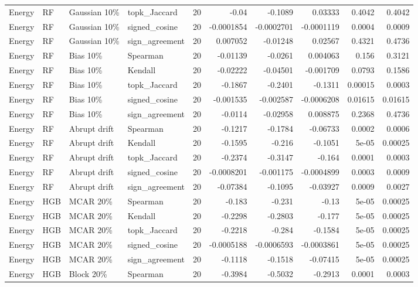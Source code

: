 \begin{tabular}{llllrrrrrr}
Energy & RF & Gaussian 10\% & topk\_Jaccard & 20 & -0.04 & -0.1089 & 0.03333 & 0.4042 & 0.4042 \\
Energy & RF & Gaussian 10\% & signed\_cosine & 20 & -0.0001854 & -0.0002701 & -0.0001119 & 0.0004 & 0.0009 \\
Energy & RF & Gaussian 10\% & sign\_agreement & 20 & 0.007052 & -0.01248 & 0.02567 & 0.4321 & 0.4736 \\
Energy & RF & Bias 10\% & Spearman & 20 & -0.01139 & -0.0261 & 0.004063 & 0.156 & 0.3121 \\
Energy & RF & Bias 10\% & Kendall & 20 & -0.02222 & -0.04501 & -0.001709 & 0.0793 & 0.1586 \\
Energy & RF & Bias 10\% & topk\_Jaccard & 20 & -0.1867 & -0.2401 & -0.1311 & 0.00015 & 0.0003 \\
Energy & RF & Bias 10\% & signed\_cosine & 20 & -0.001535 & -0.002587 & -0.0006208 & 0.01615 & 0.01615 \\
Energy & RF & Bias 10\% & sign\_agreement & 20 & -0.0114 & -0.02958 & 0.008875 & 0.2368 & 0.4736 \\
Energy & RF & Abrupt drift & Spearman & 20 & -0.1217 & -0.1784 & -0.06733 & 0.0002 & 0.0006 \\
Energy & RF & Abrupt drift & Kendall & 20 & -0.1595 & -0.216 & -0.1051 & 5e-05 & 0.00025 \\
Energy & RF & Abrupt drift & topk\_Jaccard & 20 & -0.2374 & -0.3147 & -0.164 & 0.0001 & 0.0003 \\
Energy & RF & Abrupt drift & signed\_cosine & 20 & -0.0008201 & -0.001175 & -0.0004899 & 0.0003 & 0.0009 \\
Energy & RF & Abrupt drift & sign\_agreement & 20 & -0.07384 & -0.1095 & -0.03927 & 0.0009 & 0.0027 \\
Energy & HGB & MCAR 20\% & Spearman & 20 & -0.183 & -0.231 & -0.13 & 5e-05 & 0.00025 \\
Energy & HGB & MCAR 20\% & Kendall & 20 & -0.2298 & -0.2803 & -0.177 & 5e-05 & 0.00025 \\
Energy & HGB & MCAR 20\% & topk\_Jaccard & 20 & -0.2218 & -0.284 & -0.1584 & 5e-05 & 0.00025 \\
Energy & HGB & MCAR 20\% & signed\_cosine & 20 & -0.0005188 & -0.0006593 & -0.0003861 & 5e-05 & 0.00025 \\
Energy & HGB & MCAR 20\% & sign\_agreement & 20 & -0.1118 & -0.1518 & -0.07415 & 5e-05 & 0.00025 \\
Energy & HGB & Block 20\% & Spearman & 20 & -0.3984 & -0.5032 & -0.2913 & 0.0001 & 0.0003 \\

\end{tabular}
